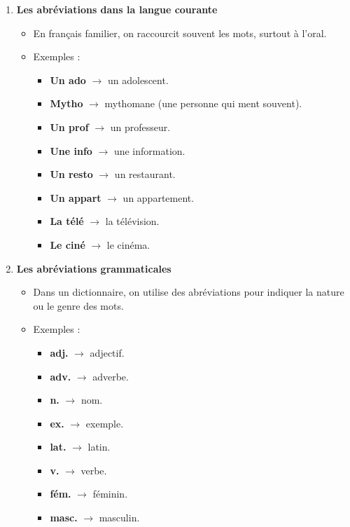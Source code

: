 \documentclass[math,code]{amznotes}
\theoremstyle{remark}
\begin{document}
\begin{enumerate}
    \item \textbf{Les abréviations dans la langue courante}
    \begin{itemize}
        \item En français familier, on raccourcit souvent les mots, surtout à l'oral.
        \item Exemples :
        \begin{itemize}
            \item \textbf{Un ado} $\rightarrow$ un adolescent.
            \item \textbf{Mytho} $\rightarrow$ mythomane (une personne qui ment souvent).
            \item \textbf{Un prof} $\rightarrow$ un professeur.
            \item \textbf{Une info} $\rightarrow$ une information.
            \item \textbf{Un resto} $\rightarrow$ un restaurant.
            \item \textbf{Un appart} $\rightarrow$ un appartement.
            \item \textbf{La télé} $\rightarrow$ la télévision.
            \item \textbf{Le ciné} $\rightarrow$ le cinéma.
        \end{itemize}
    \end{itemize}

    \item \textbf{Les abréviations grammaticales}
    \begin{itemize}
        \item Dans un dictionnaire, on utilise des abréviations pour indiquer la nature ou le genre des mots.
        \item Exemples :
        \begin{itemize}
            \item \textbf{adj.} $\rightarrow$ adjectif.
            \item \textbf{adv.} $\rightarrow$ adverbe.
            \item \textbf{n.} $\rightarrow$ nom.
            \item \textbf{ex.} $\rightarrow$ exemple.
            \item \textbf{lat.} $\rightarrow$ latin.
            \item \textbf{v.} $\rightarrow$ verbe.
            \item \textbf{fém.} $\rightarrow$ féminin.
            \item \textbf{masc.} $\rightarrow$ masculin.
        \end{itemize}
    \end{itemize}


\end{enumerate}
\end{document}
